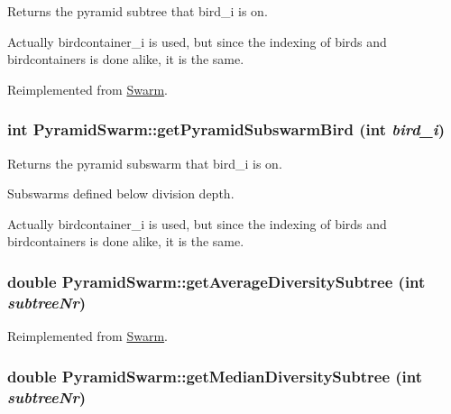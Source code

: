Returns the pyramid subtree that bird\_\-i is on. 

Actually birdcontainer\_\-i is used, but since the indexing of birds and birdcontainers is done alike, it is the same. 

Reimplemented from \hyperlink{classSwarm_c2cd792ce6be2f833f9a37377e1e0885}{Swarm}.\hypertarget{classPyramidSwarm_19babda715f51c14151187e83eb39627}{
\subsubsection{\setlength{\rightskip}{0pt plus 5cm}int PyramidSwarm::getPyramidSubswarmBird (int {\em bird\_\-i})}}
\label{classPyramidSwarm_19babda715f51c14151187e83eb39627}


Returns the pyramid subswarm that bird\_\-i is on. 

Subswarms defined below division depth.\par
 Actually birdcontainer\_\-i is used, but since the indexing of birds and birdcontainers is done alike, it is the same. \hypertarget{classPyramidSwarm_d8028bde5aa6ba3440350e3c6cca959f}{
\subsubsection{\setlength{\rightskip}{0pt plus 5cm}double PyramidSwarm::getAverageDiversitySubtree (int {\em subtreeNr})}}
\label{classPyramidSwarm_d8028bde5aa6ba3440350e3c6cca959f}




Reimplemented from \hyperlink{classSwarm_71dc0d0753bfea580e841234b9c63ebc}{Swarm}.\hypertarget{classPyramidSwarm_d27c02e0ea3cad1e6ec3303bc64958e0}{
\subsubsection{\setlength{\rightskip}{0pt plus 5cm}double PyramidSwarm::getMedianDiversitySubtree (int {\em subtreeNr})}}
\label{classPyramidSwarm_d27c02e0ea3cad1e6ec3303bc64958e0}




